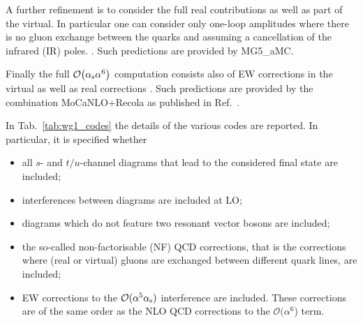 A further refinement is to consider the full real contributions as well as part of the virtual.
In particular one can consider only one-loop amplitudes where there is no gluon exchange between the quarks and assuming a cancellation of the infrared (IR) poles. .
Such predictions are provided by {\sc MG5\_aMC}.

Finally the full $\mathcal{O}{\left(\alpha_\text{s} \alpha^{6}\right)}$ computation consists also of EW corrections in the virtual as well as real corrections \cite{Biedermann:2017bss}.
Such predictions are provided by the combination {\sc MoCaNLO+Recola} as published in Ref.~\cite{Biedermann:2017bss}.

In Tab.~\ref{tab:wg1_codes} the details of the various codes are reported. In particular, it is specified whether
\begin{itemize}
    \item all $s$- and $t/u$-channel diagrams that lead to the considered final state are included;
    \item interferences between diagrams are included at LO;
    \item diagrams which do not feature two resonant vector bosons are included;
    \item the so-called non-factorisable (NF) QCD corrections, that is the corrections where (real or virtual) gluons are exchanged between different quark lines,
        are included;
    \item EW corrections to the $\mathcal O (\alpha^5\alpha_\text{s})$ interference are included. These corrections are of the same order as the NLO QCD corrections to
        the  $\mathcal O (\alpha^6$) term.
\end{itemize}

